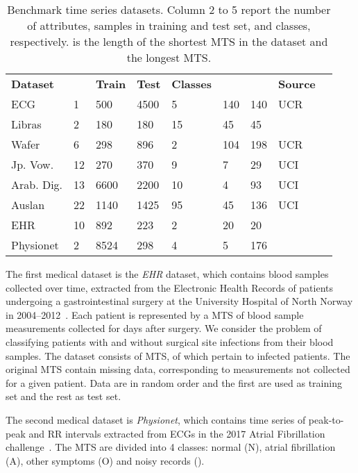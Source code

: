 \documentclass[a4paper,10pt,pdftex]{article}
\begin{document}
\bgroup
\def\arraystretch{0.95} \setlength\tabcolsep{.3em} \begin{table}[!ht]
\small
\centering
\caption{Benchmark time series datasets. Column 2 to 5 report the number of attributes, samples in training and test set, and classes, respectively. 
 is the length of the shortest MTS in the dataset and  the longest MTS.}
\label{tab:dataset_details}
\begin{tabular}{@{}ll@{ }@{ }l@{ }@{ }@{ }l@{ }@{ }@{ }ll@{ }l@{ }lc@{}}
\cmidrule[1.5pt]{1-8}
\textbf{Dataset} &  & \textbf{Train} & \textbf{Test} & \textbf{Classes} &  &  & \textbf{Source} \\
\cmidrule[.5pt]{1-8}
ECG & 1 & 500 & 4500 & 5 & 140 & 140 & UCR \\
Libras & 2 & 180 & 180 & 15 & 45 & 45 & \cite{Baydogan2016} \\
Wafer & 6 & 298 & 896 & 2 & 104 & 198 & UCR \\
Jp. Vow. & 12 & 270 & 370 & 9 & 7 & 29 & UCI \\
Arab. Dig. & 13 & 6600 & 2200 & 10 & 4 & 93 & UCI \\
Auslan & 22 & 1140 & 1425 & 95 & 45 & 136 & UCI \\
EHR & 10 & 892 & 223 & 2 & 20 & 20 & \cite{2018arXiv180307879O} \\
Physionet & 2 & 8524 & 298 & 4 & 5 & 176 & \cite{clifford2017af} \\
\cmidrule[1.5pt]{1-8}
\end{tabular}
\end{table}
\egroup


The first medical dataset is the \textit{EHR} dataset, which contains blood samples collected over time, extracted from the Electronic Health Records of patients undergoing a gastrointestinal surgery at the University Hospital of North Norway in 2004--2012~\cite{2018arXiv180307879O}. 
Each patient is represented by a MTS of  blood sample measurements collected for  days after surgery.
We consider the problem of classifying patients with and without surgical site infections from their blood samples.
The dataset consists of  MTS, of which  pertain to infected patients.
The original MTS contain missing data, corresponding to measurements not collected for a given patient.
Data are in random order and the first  are used as training set and the rest as test set.

The second medical dataset is \textit{Physionet}, which contains time series of peak-to-peak and RR intervals extracted from ECGs in the 2017 Atrial Fibrillation challenge~\cite{clifford2017af}. 
The MTS are divided into 4 classes: normal (N), atrial fibrillation (A), other symptoms (O) and noisy records ().
\end{document}

